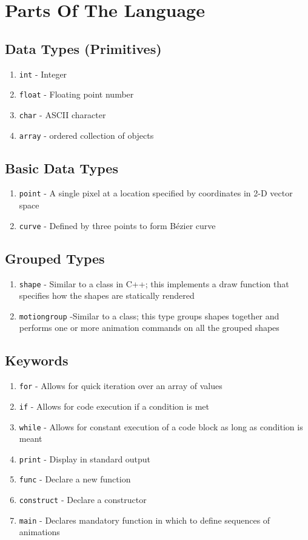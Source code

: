 \documentclass[letterpaper,12pt]{article}
\begin{document}
\section*{Parts Of The Language}

\subsection*{Data Types (Primitives)}
\begin{enumerate}
\itemsep0em
\item \texttt{int} - Integer
\item \texttt{float} - Floating point number
\item \texttt{char} - ASCII character
\item \texttt{array} - ordered collection of objects
\end{enumerate}

\subsection*{Basic Data Types}
\begin{enumerate}
\itemsep0em
\item \texttt{point} - A single pixel at a location specified by coordinates in 2-D vector space
\item \texttt{curve} - Defined by three points to form B\'ezier curve
\end{enumerate}


\subsection*{Grouped Types}
\begin{enumerate}
\item \texttt{shape} - Similar to a class in C++; this implements a draw function that specifies how the shapes are statically rendered
\item \texttt{motiongroup} -Similar to a class; this type groups shapes together and performs one or more animation commands on all the grouped shapes
\end{enumerate}

\subsection*{Keywords}
\begin{enumerate}
\itemsep0em
\item \texttt{for} - Allows for quick iteration over an array of values
\item \texttt{if} - Allows for code execution if a condition is met 
\item \texttt{while} - Allows for constant execution of a code block as long as condition is meant 
\item \texttt{print} - Display in standard output
\item \texttt{func} - Declare a new function
\item \texttt{construct} - Declare a constructor 
\item \texttt{main} - Declares mandatory function in which to define sequences of animations
\end{enumerate}
\end{document}
